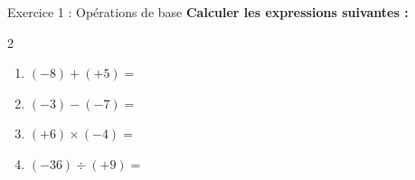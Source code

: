 \begin{exercisebox}{ Exercice 1 : Opérations de base }
  \vspace{0.2cm}
  \textbf{Calculer les expressions suivantes :}
  \begin{multicols}{2}
    \begin{enumerate}[label=\textcolor{primary}{\textbf{\alph*)}},leftmargin=*]
      \item $(-8) + (+5) = $  
      \vspace{0.8cm}
      \item $(-3) - (-7) = $  
      \vspace{0.8cm}
      \item $(+6) \times (-4) = $  
      \vspace{0.8cm}
      \item $(-36) \div (+9) = $  
    \end{enumerate}
  \end{multicols}
\end{exercisebox}

